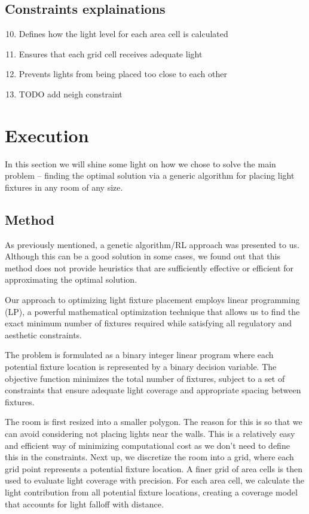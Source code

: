 \documentclass{article}
\begin{document}
\subsection{Constraints explainations}

\begin{enumerate}
    \setcounter{enumi}{9}
    \item Defines how the light level for each area cell is calculated
    \item Ensures that each grid cell receives adequate light
    \item Prevents lights from being placed too close to each other
    \item TODO add neigh constraint 
\end{enumerate}

\newpage

\section{Execution}

In this section we will shine some light on how we chose to solve the main problem – finding the optimal solution via a generic algorithm 
for placing light fixtures in any room of any size.

\subsection{Method}

As previously mentioned, a genetic algorithm/RL approach was presented to us. Although this can be a good solution in some cases, we found out that
this method does not provide heuristics that are sufficiently effective or efficient for approximating the optimal solution.

Our approach to optimizing light fixture placement employs linear programming (LP), a powerful mathematical optimization technique that allows us to 
find the exact minimum number of fixtures required while satisfying all regulatory and aesthetic constraints.

The problem is formulated as a binary integer linear program where each potential fixture location is represented by a binary decision 
variable. The objective function minimizes the total number of fixtures, subject to a set of constraints that ensure adequate light coverage 
and appropriate spacing between fixtures. 

The room is first resized into a smaller polygon. The reason for this is so that we can avoid considering not placing lights near the walls. 
This is a relatively easy and efficient way of minimizing computational cost as we don't need to define this in the constraints. Next up, we 
discretize the room into a grid, where each grid point represents a potential fixture location. A finer grid of area cells is then used to evaluate
light coverage with precision. For each area cell, we calculate the light contribution from all potential fixture locations, creating a coverage
model that accounts for light falloff with distance. 
\end{document}
